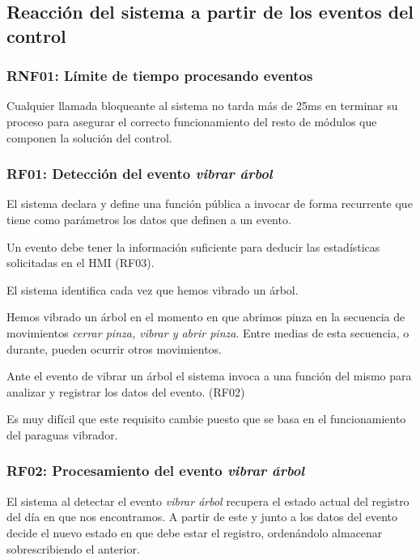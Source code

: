 \subsection{Reacción del sistema a partir de los eventos del control}

\subsubsection{RNF01: Límite de tiempo procesando eventos}

Cualquier llamada bloqueante al sistema no tarda más de 25ms
en terminar su proceso para asegurar el correcto funcionamiento del
resto de módulos que componen la solución del control.

\subsubsection{RF01: Detección del evento \textit{vibrar árbol}}

El sistema declara y define una función pública a invocar
de forma recurrente que tiene como parámetros los datos que definen
a un evento.

Un evento debe tener la información suficiente para deducir
las estadísticas solicitadas en el HMI (RF03).

El sistema identifica cada vez que hemos vibrado un árbol.

Hemos vibrado un árbol en el momento en que abrimos pinza en
la secuencia de movimientos \textit{cerrar pinza, vibrar y abrir pinza}.
Entre medias de esta secuencia, o durante, pueden ocurrir otros
movimientos.

Ante el evento de vibrar un árbol el sistema invoca a una función
del mismo para analizar y registrar los datos del evento. (RF02)

Es muy difícil que este requisito cambie puesto que se basa en el
funcionamiento del paraguas vibrador.

\subsubsection{RF02: Procesamiento del evento \textit{vibrar árbol}}

El sistema al detectar el evento \textit{vibrar árbol} recupera
el estado actual del registro del día en que nos encontramos.
A partir de este y junto a los datos del evento decide el nuevo
estado en que debe estar el registro, ordenándolo almacenar
sobrescribiendo el anterior.

